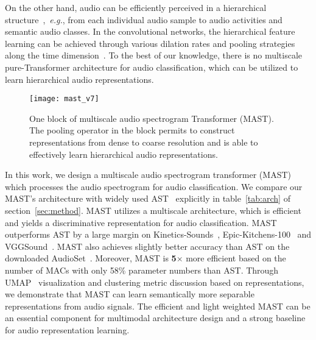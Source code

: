\documentclass{article}
\def\eg{\emph{e.g.}}
\begin{document}
On the other hand, audio can be efficiently perceived in a hierarchical structure~\cite{dieleman2013multiscale,snyder2018x},~\eg, from each individual audio sample to audio activities and semantic audio classes. In the convolutional networks, the hierarchical feature learning can be achieved through various dilation rates and pooling strategies along the time dimension~\cite{snyder2018x}. To the best of our knowledge, there is no multiscale pure-Transformer architecture for audio classification, which can be utilized to learn hierarchical audio representations. 

\begin{figure}
	\centering  \texttt{[image: mast\_v7]}
	\caption{One block of multiscale audio spectrogram Transformer (MAST). The pooling operator in the block permits to construct representations from dense to coarse resolution and is able to effectively learn hierarchical audio representations.}  \label{fig:audio_framework}
\end{figure}

In this work, we design a multiscale audio spectrogram transformer (MAST) which processes the audio spectrogram for audio classification. We compare our MAST's architecture with widely used AST~\cite{gong2021ast} explicitly in table~\ref{tab:arch} of section~\ref{sec:method}. MAST utilizes a multiscale architecture, which is efficient and yields a discriminative representation for audio classification. MAST outperforms AST by a large margin on Kinetics-Sounds~\cite{arandjelovic2017look,kay2017kinetics}, Epic-Kitchens-100~\cite{Damen2021RESCALING,Damen2018EPICKITCHENS,Damen2021PAMI} and VGGSound~\cite{chen2020vggsound}. MAST also achieves slightly better accuracy than AST on the downloaded AudioSet~\cite{gemmeke2017audio}. Moreover, MAST is \textbf{5}$\times$ more efficient based on the number of MACs with only 58\% parameter numbers than AST. Through UMAP~\cite{mcinnes2018umap} visualization and clustering metric discussion based on representations, we demonstrate that MAST can learn semantically more separable representations from audio signals. The efficient and light weighted MAST can be an essential component for multimodal architecture design and a strong baseline for audio representation learning.
\end{document}
